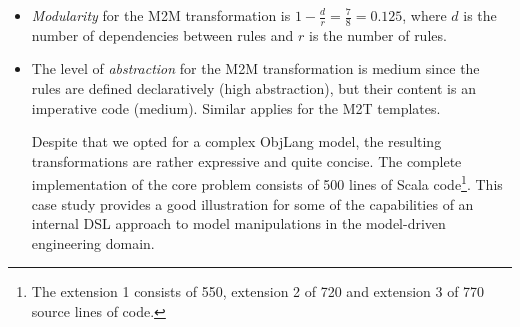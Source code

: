 \begin{itemize}[-]
  \item \emph{Modularity} for the M2M transformation is $1 - \frac{d}{r} = \frac{7}{8} = 0.125$, where $d$ is the number of dependencies between rules and $r$ is the number of rules.

  \item The level of \emph{abstraction} for the M2M transformation is medium since the rules are defined declaratively (high abstraction), but their content is an imperative code (medium).
  Similar applies for the M2T templates.

\bigskip

Despite that we opted for a complex ObjLang model, the resulting transformations are rather expressive and quite concise.
The complete implementation of the core problem consists of 500 lines of Scala code\footnote{The extension 1 consists of 550, extension 2 of 720 and extension 3 of 770 source lines of code.}.
This \FIXML case study provides a good illustration for some of the capabilities of an internal DSL approach to model manipulations in the model-driven engineering domain.


\end{itemize}






